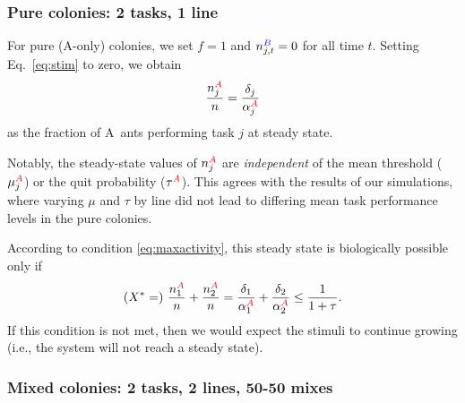 \documentclass[11pt]{article}
\newcommand{\A}{{\color{red}A}}
\newcommand{\B}{{\color{blue}B}}
\begin{document}
\begin{appendices}
\subsubsection{Pure colonies: 2 tasks, 1 line} \label{sec:pure}
For pure (\A-only) colonies, we set $f = 1$ and $n_{j,t}^{\B} = 0$ for all time $t$. Setting Eq.~\eqref{eq:stim} to zero, we obtain
\begin{equation}
    \frac{n_j^{\A}}{n} = \frac{\delta_j}{\alpha_j^{\A}}
    \label{eq:ss1}
\end{equation}
as the fraction of \A\ ants performing task $j$ at steady state.

Notably, the steady-state values of $n_j^{\A}$ are \textit{independent} of the mean threshold ($\mu_j^{\A}$) or the quit probability ($\tau^{\A}$). This agrees with the results of our simulations, where varying $\mu$ and $\tau$ by line did not lead to differing mean task performance levels in the pure colonies.

According to condition \eqref{eq:maxactivity}, this steady state is biologically possible only if
\begin{equation}
    (X^* =)\ \frac{n_1^{\A}}{n} + \frac{n_2^{\A}}{n} = \frac{\delta_1}{\alpha_1^{\A}} + \frac{\delta_2}{\alpha_2^{\A} }\leq \frac{1}{1+\tau} \label{eq:cond1}.
\end{equation}
If this condition is not met, then we would expect the stimuli to continue growing (i.e., the system will not reach a steady state).


\subsubsection{Mixed colonies: 2 tasks, 2 lines, 50-50 mixes} \label{sec:5050}


\end{appendices}
\end{document}
